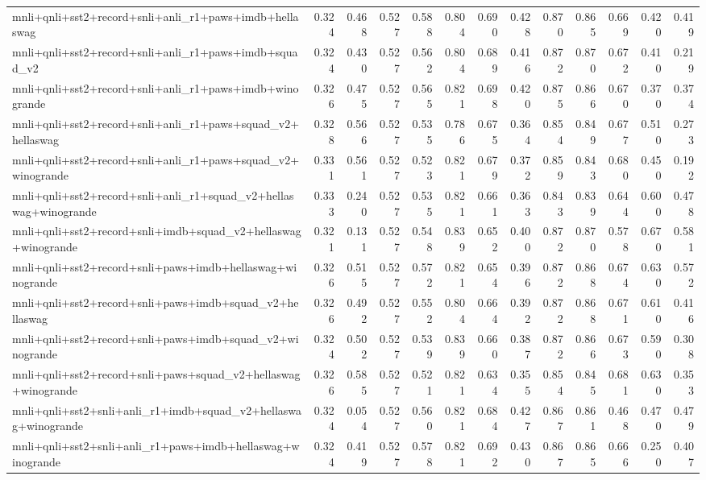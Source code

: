 \begin{table}[t]
\begin{tabular}{lrrrrrrrrrrrr}
    mnli+qnli+sst2+record+snli+anli\_r1+paws+imdb+hellaswag & 0.324 & 0.468 & 0.527 & 0.588 & 0.804 & 0.690 & 0.428 & 0.870 & 0.865 & 0.669 & 0.420 & 0.419 \\
    mnli+qnli+sst2+record+snli+anli\_r1+paws+imdb+squad\_v2 & 0.324 & 0.430 & 0.527 & 0.562 & 0.804 & 0.689 & 0.416 & 0.872 & 0.870 & 0.672 & 0.410 & 0.219 \\
    mnli+qnli+sst2+record+snli+anli\_r1+paws+imdb+winogrande & 0.326 & 0.475 & 0.527 & 0.565 & 0.821 & 0.698 & 0.420 & 0.875 & 0.866 & 0.670 & 0.370 & 0.374 \\
    mnli+qnli+sst2+record+snli+anli\_r1+paws+squad\_v2+hellaswag & 0.328 & 0.566 & 0.527 & 0.535 & 0.786 & 0.675 & 0.364 & 0.854 & 0.849 & 0.677 & 0.510 & 0.273 \\
    mnli+qnli+sst2+record+snli+anli\_r1+paws+squad\_v2+winogrande & 0.331 & 0.561 & 0.527 & 0.523 & 0.821 & 0.679 & 0.372 & 0.859 & 0.843 & 0.680 & 0.450 & 0.192 \\
    mnli+qnli+sst2+record+snli+anli\_r1+squad\_v2+hellaswag+winogrande & 0.333 & 0.240 & 0.527 & 0.535 & 0.821 & 0.661 & 0.363 & 0.843 & 0.839 & 0.644 & 0.600 & 0.478 \\
    mnli+qnli+sst2+record+snli+imdb+squad\_v2+hellaswag+winogrande & 0.321 & 0.131 & 0.527 & 0.548 & 0.839 & 0.652 & 0.400 & 0.872 & 0.870 & 0.578 & 0.670 & 0.581 \\
    mnli+qnli+sst2+record+snli+paws+imdb+hellaswag+winogrande & 0.326 & 0.515 & 0.527 & 0.572 & 0.821 & 0.654 & 0.396 & 0.872 & 0.868 & 0.674 & 0.630 & 0.572 \\
    mnli+qnli+sst2+record+snli+paws+imdb+squad\_v2+hellaswag & 0.326 & 0.492 & 0.527 & 0.552 & 0.804 & 0.664 & 0.392 & 0.872 & 0.868 & 0.671 & 0.610 & 0.416 \\
    mnli+qnli+sst2+record+snli+paws+imdb+squad\_v2+winogrande & 0.324 & 0.502 & 0.527 & 0.539 & 0.839 & 0.660 & 0.387 & 0.872 & 0.866 & 0.673 & 0.590 & 0.308 \\
    mnli+qnli+sst2+record+snli+paws+squad\_v2+hellaswag+winogrande & 0.326 & 0.585 & 0.527 & 0.521 & 0.821 & 0.634 & 0.355 & 0.854 & 0.845 & 0.681 & 0.630 & 0.353 \\
    mnli+qnli+sst2+snli+anli\_r1+imdb+squad\_v2+hellaswag+winogrande & 0.324 & 0.054 & 0.527 & 0.560 & 0.821 & 0.684 & 0.427 & 0.867 & 0.861 & 0.468 & 0.470 & 0.479 \\
    mnli+qnli+sst2+snli+anli\_r1+paws+imdb+hellaswag+winogrande & 0.324 & 0.419 & 0.527 & 0.578 & 0.821 & 0.692 & 0.430 & 0.867 & 0.865 & 0.666 & 0.250 & 0.407 \\

\end{tabular}
\end{table}
